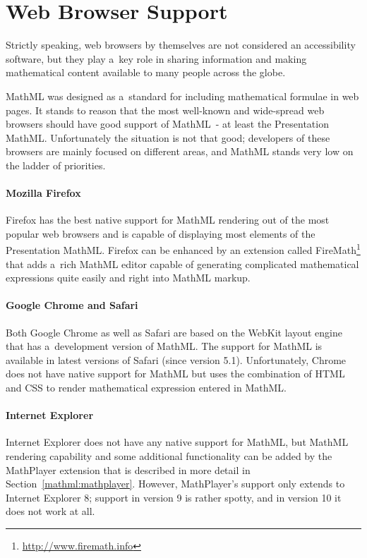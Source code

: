 \documentclass[11pt,oneside,final]{fithesis2}
\begin{document}
\section{Web Browser Support}
Strictly speaking, web browsers by themselves are not considered an accessibility software, but they play a~key role in sharing information and making mathematical content available to many people across the globe.

MathML was designed as a~standard for including mathematical formulae in web pages. It stands to reason that the most well-known and wide-spread web browsers should have good support of MathML~- at least the Presentation MathML. Unfortunately the situation is not that good; developers of these browsers are mainly focused on different areas, and MathML stands very low on the ladder of priorities.

\paragraph*{Mozilla Firefox} 
Firefox has the best native support for MathML rendering out of the most popular web browsers and is capable of displaying most elements of the Presentation MathML. Firefox can be enhanced by an extension called FireMath\footnote{\url{http://www.firemath.info}} that adds a~rich MathML editor capable of generating complicated mathematical expressions quite easily and right into MathML markup.

\paragraph*{Google Chrome and Safari}
Both Google Chrome as well as Safari are based on the WebKit layout engine that has a~development version of MathML. The support for MathML is available in latest versions of Safari (since version 5.1). Unfortunately, Chrome does not have native support for MathML but uses the combination of HTML and CSS to render mathematical expression entered in MathML.

\paragraph*{Internet Explorer}
Internet Explorer does not have any native support for MathML, but MathML rendering capability and some additional functionality can be added by the MathPlayer extension that is described in more detail in Section~\ref{mathml:mathplayer}. However, MathPlayer's support only extends to Internet Explorer 8; support in version 9 is rather spotty, and in version 10 it does not work at all.
\end{document}
